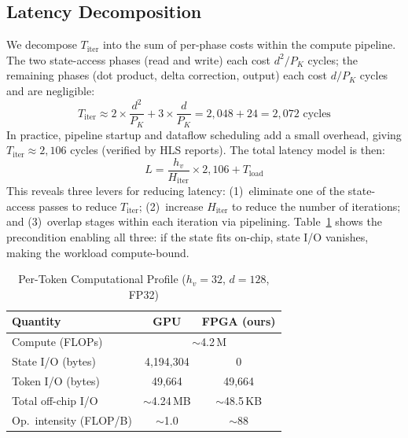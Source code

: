 \documentclass[conference]{IEEEtran}
\begin{document}
\subsection{Latency Decomposition}

We decompose $T_{\mathrm{iter}}$ into the sum of per-phase costs within
the compute pipeline. The two state-access phases (read and write) each
cost $d^2 / P_K$ cycles; the remaining phases (dot product, delta
correction, output) each cost $d / P_K$ cycles and are negligible:
%
\begin{equation}
  T_{\mathrm{iter}} \approx 2 \times \frac{d^2}{P_K}
  + 3 \times \frac{d}{P_K}
  = 2{,}048 + 24 = 2{,}072 \text{ cycles}
  \label{eq:titer}
\end{equation}
%
In practice, pipeline startup and dataflow scheduling add a small
overhead, giving $T_{\mathrm{iter}} \approx 2{,}106$ cycles (verified by
HLS reports). The total latency model is then:
%
\begin{equation}
  L = \frac{h_v}{H_{\mathrm{iter}}} \times 2{,}106 + T_{\mathrm{load}}
  \label{eq:latency_model}
\end{equation}
%
This reveals three levers for reducing latency: (1)~eliminate one of the
state-access passes to reduce $T_{\mathrm{iter}}$; (2)~increase
$H_{\mathrm{iter}}$ to reduce the number of iterations; and
(3)~overlap stages within each iteration via pipelining.
Table~\ref{tab:profile} shows the precondition enabling all three: if
the state fits on-chip, state I/O vanishes, making the workload
compute-bound.

\begin{table}[t]
\centering
\caption{Per-Token Computational Profile ($h_v{=}32$, $d{=}128$, FP32)}
\label{tab:profile}
\begin{tabular}{lcc}
\toprule
\textbf{Quantity} & \textbf{GPU} & \textbf{FPGA (ours)} \\
\midrule
Compute (FLOPs) & \multicolumn{2}{c}{$\sim$4.2\,M} \\
State I/O (bytes) & 4,194,304 & 0 \\
Token I/O (bytes) & 49,664 & 49,664 \\
\midrule
Total off-chip I/O & $\sim$4.24\,MB & $\sim$48.5\,KB \\
Op.\ intensity (FLOP/B) & $\sim$1.0 & $\sim$88 \\
\bottomrule
\end{tabular}
\end{table}

\end{document}
